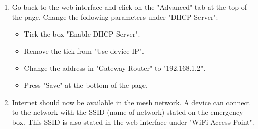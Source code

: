 \begin{enumerate}
\item Go back to the web interface and click on the "Advanced"-tab at the top of the page. Change the following parameters under "DHCP Server":
\begin{itemize}
\item Tick the box "Enable DHCP Server".
\item Remove the tick from "Use device IP".
\item Change the address in "Gateway Router" to "192.168.1.2".
\item Press "Save" at the bottom of the page. 
\end{itemize}

\item Internet should now be available in the mesh network. A device can connect to the network with the SSID (name of network) stated on the emergency box. This SSID is also stated in the web interface under "WiFi Access Point".  
\end{enumerate}
